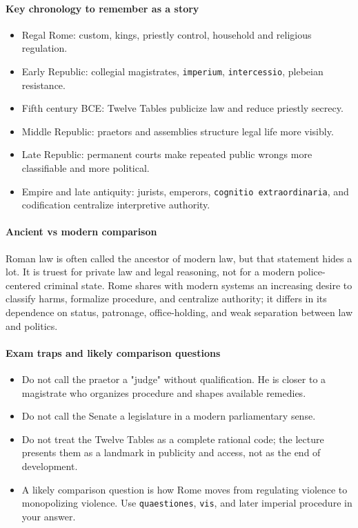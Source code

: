 \documentclass[11pt]{article}
\begin{document}
\paragraph{Key chronology to remember as a story}

\begin{itemize}
\item Regal Rome: custom, kings, priestly control, household and religious regulation.
\item Early Republic: collegial magistrates, \texttt{imperium}, \texttt{intercessio}, plebeian resistance.
\item Fifth century BCE: Twelve Tables publicize law and reduce priestly secrecy.
\item Middle Republic: praetors and assemblies structure legal life more visibly.
\item Late Republic: permanent courts make repeated public wrongs more classifiable and more political.
\item Empire and late antiquity: jurists, emperors, \texttt{cognitio extraordinaria}, and codification centralize interpretive authority.
\end{itemize}

\paragraph{Ancient vs modern comparison}

Roman law is often called the ancestor of modern law, but that statement hides a lot. It is truest for private law and legal reasoning, not for a modern police-centered criminal state. Rome shares with modern systems an increasing desire to classify harms, formalize procedure, and centralize authority; it differs in its dependence on status, patronage, office-holding, and weak separation between law and politics.

\paragraph{Exam traps and likely comparison questions}

\begin{itemize}
\item Do not call the praetor a "judge" without qualification. He is closer to a magistrate who organizes procedure and shapes available remedies.
\item Do not call the Senate a legislature in a modern parliamentary sense.
\item Do not treat the Twelve Tables as a complete rational code; the lecture presents them as a landmark in publicity and access, not as the end of development.
\item A likely comparison question is how Rome moves from regulating violence to monopolizing violence. Use \texttt{quaestiones}, \texttt{vis}, and later imperial procedure in your answer.
\end{itemize}
\end{document}
